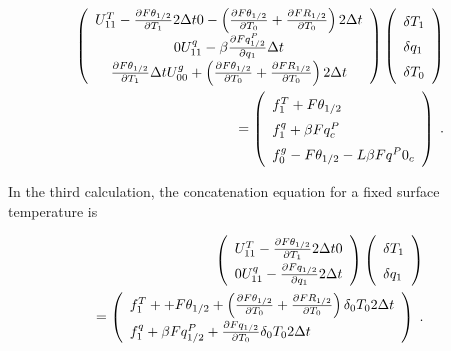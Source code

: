 \begin{eqnarray}
 \renewcommand{\arraystretch}{1.5}
  \left( \begin{array}{ccc}
      U_{11}^T - \frac{\partial F\theta_{1/2}}{\partial T_1} 2 \Delta t 
      0 
      - \left( \frac{\partial F\theta_{1/2}}{\partial T_0} 
                         + \frac{\partial FR_{1/2}}{\partial T_0}\right) 2 \Delta t \\
      0 
      U_{11}^q - \beta \frac{\partial Fq^P_{1/2}}{\partial q_1} \Delta t  \\
        \frac{\partial F\theta_{1/2}}{\partial T_1} \Delta t  
      U_{00}^g + \left(\frac{\partial F\theta_{1/2}}{\partial T_0}
                + \frac{\partial FR_{1/2}}{\partial T_0} \right) 2 \Delta t \\
  \end{array} \right)
  \left( \begin{array}{l}
      \delta T_1 \\ \delta q_1 \\ \delta T_0 \\
  \end{array} \right)   \\
=
  \left( \begin{array}{l}
      f_1^T + F\theta_{1/2} \\  
      f_1^q + \beta Fq^P_c \\  
      f_0^g - F\theta_{1/2} - L \beta Fq^P0_c \\  
  \end{array} \right) \; .
\end{eqnarray}

In the third calculation, the concatenation equation for a fixed surface
temperature is

\begin{eqnarray}
 \renewcommand{\arraystretch}{1.5}
  \left( \begin{array}{cc}
      U_{11}^T - \frac{\partial F\theta_{1/2}}{\partial T_1} 2 \Delta t 
      0 \\
      0 
      U_{11}^q - \frac{\partial Fq_{1/2}}{\partial q_1} 2 \Delta t \\
  \end{array} \right)
  \left( \begin{array}{l}
      \delta T_1 \\ \delta q_1 \\
  \end{array} \right)  \\
=
  \left( \begin{array}{l}
      f_1^T + + F\theta_{1/2}
      + \left( \frac{\partial F\theta_{1/2}}{\partial T_0} 
                    + \frac{\partial FR_{1/2}}{\partial T_0} \right) \delta_0 T_0 2 \Delta t \\
      f_1^q +  \beta Fq^P_{1/2} 
      + \frac{\partial Fq_{1/2}}{\partial T_0} \delta_0 T_0 2 \Delta t \\
  \end{array} \right) \; .
\end{eqnarray}

